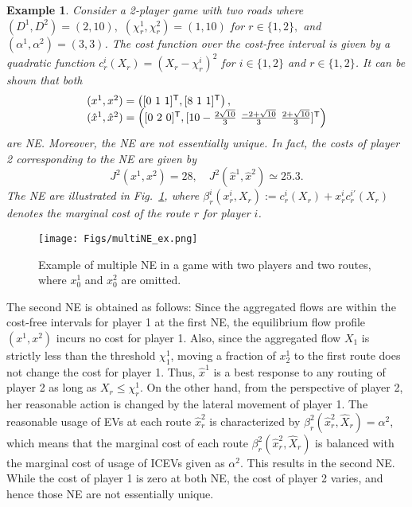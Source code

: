 \documentclass[letterpaper, 10 pt, conference]{ieeeconf}  %
\newcommand{\mc}[1]{\mathcal{#1}}
\newtheorem{exa}{Example}
\begin{document}
\begin{exa}
Consider a 2-player game with two roads where $(D^1,D^2)=(2,10),$ $(\chi^1_r,\chi^2_r)=(1,10)$ for $r\in\{1,2\},$ and $(\alpha^1,\alpha^2)=(3,3)$.
The cost function over the cost-free interval is given by a quadratic function $c^i_r(X_r)=(X_r-\chi^i_r)^2$ for $i\in\{1,2\}$ and $r\in\{1,2\}$.
It can be shown that both
\[
\begin{array}{l}
 (x^1,x^2)=\left([0\ 1\ 1]^{\sf T}, [8\ 1\ 1]^{\sf T}\right),\\
 (\hat{x}^1,\hat{x}^2)=\left([0\ 2\ 0]^{\sf T}, [10-\frac{2\sqrt{10}}{3}\ \frac{-2+\sqrt{10}}{3}\ \frac{2+\sqrt{10}}{3}]^{\sf T}\right)
\end{array}
\]
are NE.
Moreover, the NE are not essentially unique.
In fact, the costs of player 2 corresponding to the NE are given by
\[
 \textstyle{
  J^2(x^1,x^2)=28,\quad J^2(\hat{x}^1,\hat{x}^2)\simeq 25.3.
 }
\]
The NE are illustrated in Fig.~\ref{fig:multiNE_ex}, where $\beta^i_r(x^i_r,X_r):=c^i_r(X_r)+x^i_rc^{i \prime}_r(X_r)$ denotes the marginal cost of the route $r$ for player $i$.
\end{exa}

\begin{figure}[t]
  \centering
  \texttt{[image: Figs/multiNE\_ex.png]}
  \caption{
  Example of multiple NE in a game with two players and two routes, where $x^1_0$ and $x^2_0$ are omitted.
  }
  \label{fig:multiNE_ex}
\end{figure}

The second NE is obtained as follows:
Since the aggregated flows are within the cost-free intervals for player 1 at the first NE, the equilibrium flow profile $(x^1,x^2)$ incurs no cost for player 1.
Also, since the aggregated flow $X_1$ is strictly less than the threshold $\chi^1_1$, moving a fraction of $x^1_2$ to the first route does not change the cost for player 1.
Thus, $\hat{x}^1$ is a best response to any routing of player 2 as long as $X_r\leq \chi^1_r$.
On the other hand, from the perspective of player 2, her reasonable action is changed by the lateral movement of player 1.
The reasonable usage of EVs at each route $\hat{x}^2_r$ is characterized by $\beta^2_r(\hat{x}^2_r,\hat{X}_r)=\alpha^2$, which means that the marginal cost of each route $\beta^2_r(\hat{x}^2_r,\hat{X}_r)$ is balanced with the marginal cost of usage of ICEVs given as $\alpha^2$.
This results in the second NE.
While the cost of player 1 is zero at both NE, the cost of player 2 varies, and hence those NE are not essentially unique.
\end{document}
